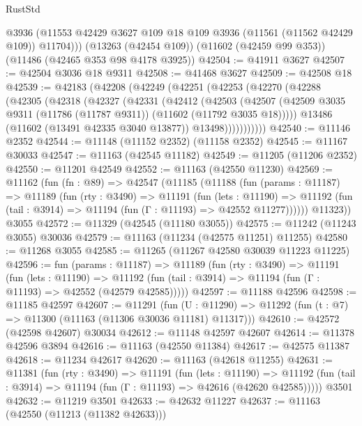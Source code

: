 \begin{lexlean}{RustStd}
\begin{coremodule}
        @3936
        (@11553 @42429 @3627 @109 @18 @109 @3936 (@11561 (@11562 @42429 @109)) @11704)))
    (@13263 (@42454 @109))
    (@11602 (@42459 @99 @353))
    (@11486 (@42465 @353 @98 @4178 @3925))
@42504 := @41911 @3627
@42507 := @42504 @3036 @18 @9311
@42508 := @41468 @3627
@42509 := @42508 @18
@42539 := @42183
    (@42208
      (@42249
        (@42251
          (@42253
            (@42270
              (@42288
                (@42305
                  (@42318
                    (@42327
                      (@42331
                        (@42412
                          (@42503
                            (@42507
                              (@42509
                                @3035
                                @9311
                                (@11786 (@11787 @9311))
                                (@11602 (@11792 @3035 @18)))))
                          @13486
                          (@11602 (@13491 @42335 @3040 @13877))
                          @13498)))))))))))
@42540 := @11146 @2352
@42544 := @11148 (@11152 @2352) (@11158 @2352)
@42545 := @11167 @30033
@42547 := @11163 (@42545 @11182)
@42549 := @11205 (@11206 @2352)
@42550 := @11201 @42549
@42552 := @11163 (@42550 @11230)
@42569 := @11162
    (fun (fn : @89) =>
    @42547
      (@11185
        (@11188
          (fun (params : @11187) =>
          @11189
            (fun (rty : @3490) =>
            @11191
              (fun (lets : @11190) =>
              @11192 (fun (tail : @3914) => @11194 (fun (Γ : @11193) => @42552 @11277))))))
        @11323))
    @3055
@42572 := @11329 (@42545 (@11180 @3055))
@42575 := @11242 (@11243 @3055) @30036
@42579 := @11163 (@11234 (@42575 @11251) @11255)
@42580 := @11268 @3055
@42585 := @11265 (@11267 @42580 @30039 @11223 @11225)
@42596 := fun (params : @11187) =>
  @11189
    (fun (rty : @3490) =>
    @11191
      (fun (lets : @11190) =>
      @11192 (fun (tail : @3914) => @11194 (fun (Γ : @11193) => @42552 (@42579 @42585)))))
@42597 := @11188 @42596
@42598 := @11185 @42597
@42607 := @11291
    (fun (U : @11290) => @11292 (fun (t : @7) => @11300 (@11163 (@11306 @30036 @11181) @11317)))
@42610 := @42572 (@42598 @42607) @30034
@42612 := @11148 @42597 @42607
@42614 := @11378 @42596 @3894
@42616 := @11163 (@42550 @11384)
@42617 := @42575 @11387
@42618 := @11234 @42617
@42620 := @11163 (@42618 @11255)
@42631 := @11381
    (fun (rty : @3490) =>
    @11191
      (fun (lets : @11190) =>
      @11192 (fun (tail : @3914) => @11194 (fun (Γ : @11193) => @42616 (@42620 @42585)))))
    @3501
@42632 := @11219 @3501
@42633 := @42632 @11227
@42637 := @11163 (@42550 (@11213 (@11382 @42633)))

\end{coremodule}
\end{lexlean}
